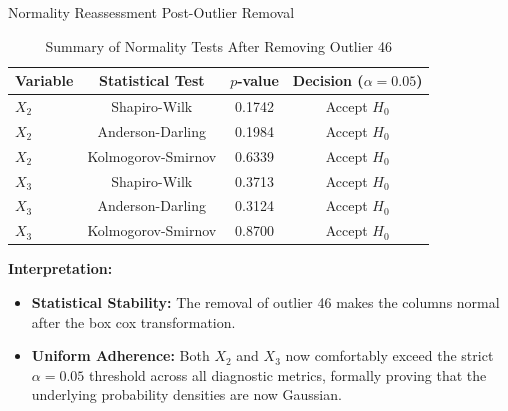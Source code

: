 \documentclass[8pt, aspectratio=169]{beamer}
\begin{document}
\begin{frame}{Normality Reassessment Post-Outlier Removal}
    \begin{table}
        \centering
        \small
        \begin{tabular}{l c c c}
            \toprule
            \textbf{Variable} & \textbf{Statistical Test} & \textbf{$p$-value} & \textbf{Decision ($\alpha = 0.05$)} \\
            \midrule
            $X_2$ & Shapiro-Wilk & 0.1742 & Accept $H_0$ \\
            $X_2$ & Anderson-Darling & 0.1984 & Accept $H_0$ \\
            $X_2$ & Kolmogorov-Smirnov & 0.6339 & Accept $H_0$ \\
            \midrule
            $X_3$ & Shapiro-Wilk & 0.3713 & Accept $H_0$ \\
            $X_3$ & Anderson-Darling & 0.3124 & Accept $H_0$ \\
            $X_3$ & Kolmogorov-Smirnov & 0.8700 & Accept $H_0$ \\
            \bottomrule
        \end{tabular}
        \caption{Summary of Normality Tests After Removing Outlier 46}
    \end{table}

    \vspace{0.2cm}
    \textbf{Interpretation:}
    \begin{itemize}
        \item \textbf{Statistical Stability:} The removal of outlier 46 makes the columns normal after the box cox transformation.
        \item \textbf{Uniform Adherence:} Both $X_2$ and $X_3$ now comfortably exceed the strict $\alpha = 0.05$ threshold across all diagnostic metrics, formally proving that the underlying probability densities are now Gaussian.
    \end{itemize}
\end{frame}
\end{document}
